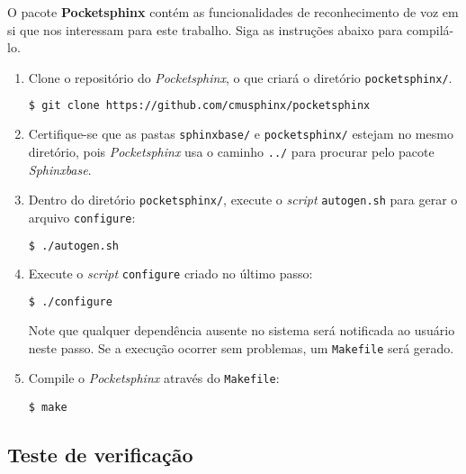 O pacote \textbf{Pocketsphinx} contém as funcionalidades de reconhecimento de voz em si que nos interessam para este trabalho. Siga as instruções abaixo para compilá-lo.

\begin{enumerate}
\item Clone o repositório do \textit{Pocketsphinx}, o que criará o diretório \texttt{pocketsphinx/}.

\begin{lstlisting}[language=Bash]
$ git clone https://github.com/cmusphinx/pocketsphinx
\end{lstlisting}

\item Certifique-se que as pastas \texttt{sphinxbase/} e \texttt{pocketsphinx/} estejam no mesmo diretório, pois \textit{Pocketsphinx} usa o caminho \texttt{../} para procurar pelo pacote \textit{Sphinxbase}.

\item Dentro do diretório \texttt{pocketsphinx/}, execute o \textit{script} \texttt{autogen.sh} para gerar o arquivo \texttt{configure}:

\begin{lstlisting}[language=Bash]
$ ./autogen.sh
\end{lstlisting}

\item Execute o \textit{script} \texttt{configure} criado no último passo:

\begin{lstlisting}[language=Bash]
$ ./configure
\end{lstlisting}

Note que qualquer dependência ausente no sistema será notificada ao usuário neste passo. Se a execução ocorrer sem problemas, um \texttt{Makefile} será gerado.

\item Compile o \textit{Pocketsphinx} através do \texttt{Makefile}:

\begin{lstlisting}
$ make
\end{lstlisting}
\end{enumerate}


\subsection{Teste de verificação}

